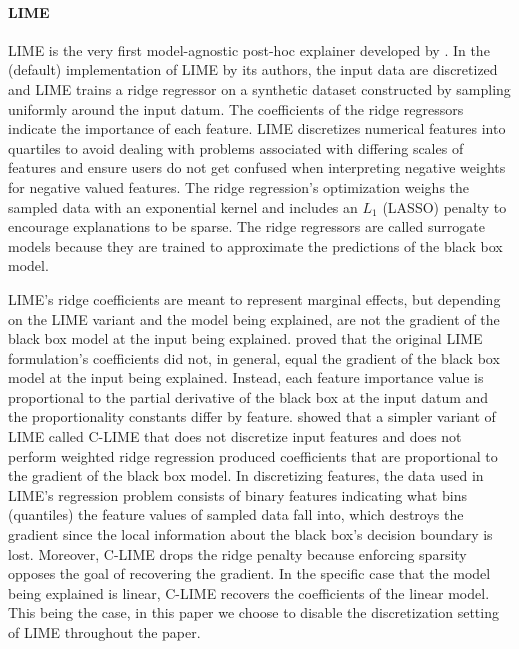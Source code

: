 \documentclass[mnsc,blindrev]{informs3}
\begin{document}
\paragraph{LIME}  %
LIME is the very first model-agnostic post-hoc explainer developed by \citet{ribeiro16lime}. In the (default) implementation of LIME by its authors, the input data are discretized and LIME trains a ridge regressor on a synthetic dataset constructed by sampling uniformly around the input datum. The coefficients of the ridge regressors indicate the importance of each feature. LIME discretizes numerical features into quartiles to avoid dealing with problems associated with differing scales of features and ensure users do not get confused when interpreting negative weights for negative valued features. The ridge regression's optimization weighs the sampled data with an exponential kernel and includes an $L_1$ (LASSO) penalty to encourage explanations to be sparse. The ridge regressors are called surrogate models because they are trained to approximate the predictions of the black box model.
    
    LIME's ridge coefficients are meant to represent marginal effects, but depending on the LIME variant and the model being explained, are not the gradient of the black box model at the input being explained. \citet{garreau20theoretical,garreau2020looking} proved that the original LIME formulation's coefficients did not, in general, equal the gradient of the black box model at the input being explained. Instead, each feature importance value is proportional to the partial derivative of the black box at the input datum and the proportionality constants differ by feature. \citet{agarwal21clime} showed that a simpler variant of LIME called C-LIME that does not discretize input features and does not perform weighted ridge regression produced coefficients that are proportional to the gradient of the black box model. %
    In discretizing features, the data used in LIME's regression problem consists of binary features indicating what bins (quantiles) the feature values of sampled data fall into, which destroys the gradient since the local information about the black box's decision boundary is lost. Moreover, C-LIME drops the ridge penalty because enforcing sparsity opposes the goal of recovering the gradient. In the specific case that the model being explained is linear, C-LIME recovers the coefficients of the linear model. This being the case, in this paper we choose to disable the discretization setting of LIME throughout the paper.
\end{document}
